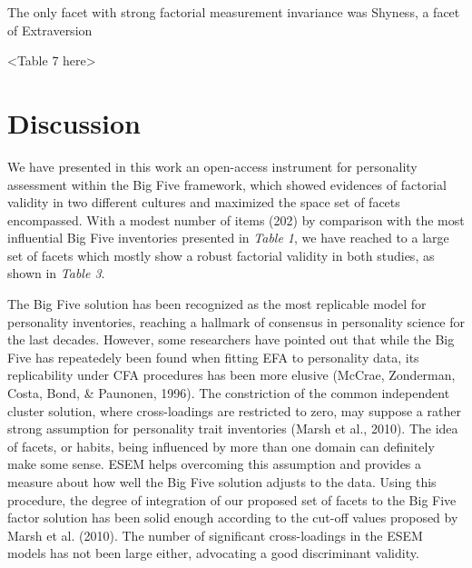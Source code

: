 \documentclass[,man,floatsintext]{apa6}
\theoremstyle{definition}
\theoremstyle{definition}
\theoremstyle{definition}
\theoremstyle{remark}
\begin{document}
The only facet with strong factorial measurement invariance was Shyness,
a facet of Extraversion

\vspace{5mm}

\textless{}Table 7 here\textgreater{}

\vspace{5mm}

\hypertarget{discussion}{%
\section{Discussion}\label{discussion}}

We have presented in this work an open-access instrument for personality
assessment within the Big Five framework, which showed evidences of
factorial validity in two different cultures and maximized the space set
of facets encompassed. With a modest number of items (202) by comparison
with the most influential Big Five inventories presented in \emph{Table
1}, we have reached to a large set of facets which mostly show a robust
factorial validity in both studies, as shown in \emph{Table 3}.

The Big Five solution has been recognized as the most replicable model
for personality inventories, reaching a hallmark of consensus in
personality science for the last decades. However, some researchers have
pointed out that while the Big Five has repeatedely been found when
fitting EFA to personality data, its replicability under CFA procedures
has been more elusive (McCrae, Zonderman, Costa, Bond, \& Paunonen,
1996). The constriction of the common independent cluster solution,
where cross-loadings are restricted to zero, may suppose a rather strong
assumption for personality trait inventories (Marsh et al., 2010). The
idea of facets, or habits, being influenced by more than one domain can
definitely make some sense. ESEM helps overcoming this assumption and
provides a measure about how well the Big Five solution adjusts to the
data. Using this procedure, the degree of integration of our proposed
set of facets to the Big Five factor solution has been solid enough
according to the cut-off values proposed by Marsh et al. (2010). The
number of significant cross-loadings in the ESEM models has not been
large either, advocating a good discriminant validity.
\end{document}

